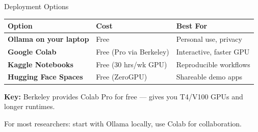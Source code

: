 \documentclass[aspectratio=169]{beamer}
\begin{document}
\begin{frame}{Deployment Options}
    \begin{table}
        \centering
        \begin{tabular}{@{}p{}p{}p{}@{}}
            \toprule
            \textbf{Option} & \textbf{Cost} & \textbf{Best For} \\
            \midrule
            \textbf{Ollama on your laptop} & Free & Personal use, privacy \\
            \addlinespace
            \textbf{Google Colab} & Free (Pro via Berkeley) & Interactive, faster GPU \\
            \addlinespace
            \textbf{Kaggle Notebooks} & Free (30 hrs/wk GPU) & Reproducible workflows \\
            \addlinespace
            \textbf{Hugging Face Spaces} & Free (ZeroGPU) & Shareable demo apps \\
            \bottomrule
        \end{tabular}
    \end{table}

    \vspace{0.5em}
    \textbf{Key:} Berkeley provides Colab Pro for free --- gives you T4/V100 GPUs and longer runtimes.

    \vspace{0.5em}
    For most researchers: start with Ollama locally, use Colab for collaboration.
\end{frame}
\end{document}
